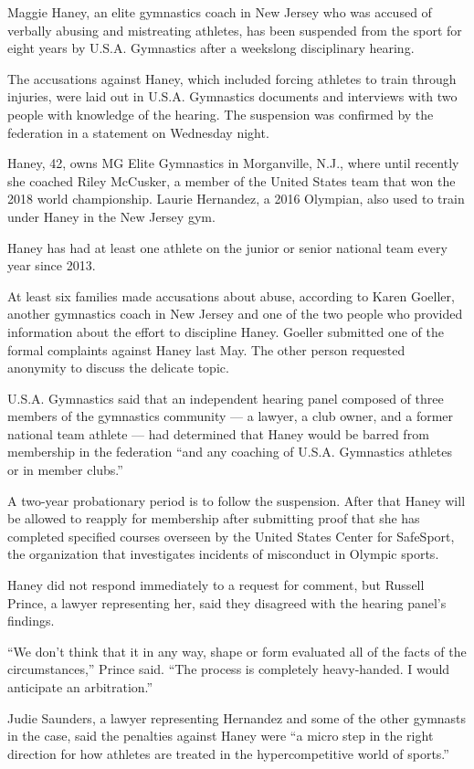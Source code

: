 Maggie Haney, an elite gymnastics coach in New Jersey who was accused of
verbally abusing and mistreating athletes, has been suspended from the
sport for eight years by U.S.A. Gymnastics after a weekslong
disciplinary hearing.

The accusations against Haney, which included forcing athletes to train
through injuries, were laid out in U.S.A. Gymnastics documents and
interviews with two people with knowledge of the hearing. The suspension
was confirmed by the federation in a statement on Wednesday night.

Haney, 42, owns MG Elite Gymnastics in Morganville, N.J., where until
recently she coached Riley McCusker, a member of the United States team
that won the 2018 world championship. Laurie Hernandez, a 2016 Olympian,
also used to train under Haney in the New Jersey gym.

Haney has had at least one athlete on the junior or senior national team
every year since 2013.

At least six families made accusations about abuse, according to Karen
Goeller, another gymnastics coach in New Jersey and one of the two
people who provided information about the effort to discipline Haney.
Goeller submitted one of the formal complaints against Haney last May.
The other person requested anonymity to discuss the delicate topic.

U.S.A. Gymnastics said that an independent hearing panel composed of
three members of the gymnastics community --- a lawyer, a club owner,
and a former national team athlete --- had determined that Haney would
be barred from membership in the federation ``and any coaching of U.S.A.
Gymnastics athletes or in member clubs.''

A two-year probationary period is to follow the suspension. After that
Haney will be allowed to reapply for membership after submitting proof
that she has completed specified courses overseen by the United States
Center for SafeSport, the organization that investigates incidents of
misconduct in Olympic sports.

Haney did not respond immediately to a request for comment, but Russell
Prince, a lawyer representing her, said they disagreed with the hearing
panel's findings.

``We don't think that it in any way, shape or form evaluated all of the
facts of the circumstances,'' Prince said. ``The process is completely
heavy-handed. I would anticipate an arbitration.''

Judie Saunders, a lawyer representing Hernandez and some of the other
gymnasts in the case, said the penalties against Haney were ``a micro
step in the right direction for how athletes are treated in the
hypercompetitive world of sports.''

